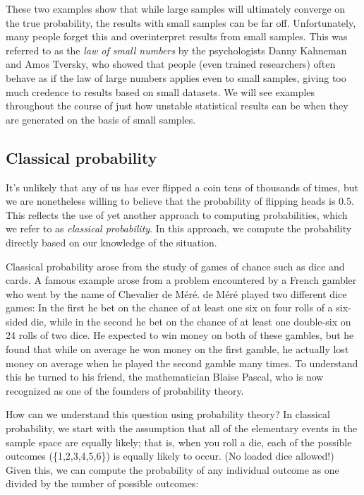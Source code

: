 \documentclass[12pt,]{book}
\theoremstyle{definition}
\theoremstyle{definition}
\theoremstyle{definition}
\theoremstyle{remark}
\begin{document}
These two examples show that while large samples will ultimately converge on the true probability, the results with small samples can be far off. Unfortunately, many people forget this and overinterpret results from small samples. This was referred to as the \emph{law of small numbers} by the psychologists Danny Kahneman and Amos Tversky, who showed that people (even trained researchers) often behave as if the law of large numbers applies even to small samples, giving too much credence to results based on small datasets. We will see examples throughout the course of just how unstable statistical results can be when they are generated on the basis of small samples.

\hypertarget{classical-probability}{%
\subsection{Classical probability}\label{classical-probability}}

It's unlikely that any of us has ever flipped a coin tens of thousands of times, but we are nonetheless willing to believe that the probability of flipping heads is 0.5. This reflects the use of yet another approach to computing probabilities, which we refer to as \emph{classical probability}. In this approach, we compute the probability directly based on our knowledge of the situation.

Classical probability arose from the study of games of chance such as dice and cards. A famous example arose from a problem encountered by a French gambler who went by the name of Chevalier de Méré. de Méré played two different dice games: In the first he bet on the chance of at least one six on four rolls of a six-sided die, while in the second he bet on the chance of at least one double-six on 24 rolls of two dice. He expected to win money on both of these gambles, but he found that while on average he won money on the first gamble, he actually lost money on average when he played the second gamble many times. To understand this he turned to his friend, the mathematician Blaise Pascal, who is now recognized as one of the founders of probability theory.

How can we understand this question using probability theory? In classical probability, we start with the assumption that all of the elementary events in the sample space are equally likely; that is, when you roll a die, each of the possible outcomes (\{1,2,3,4,5,6\}) is equally likely to occur. (No loaded dice allowed!) Given this, we can compute the probability of any individual outcome as one divided by the number of possible outcomes:
\end{document}
